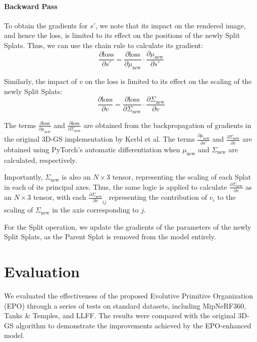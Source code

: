 \documentclass[11pt]{report}
\begin{document}
\subsubsection{Backward Pass}
To obtain the gradients for $s'$, we note that its impact on the rendered image, and hence the loss, is limited to its effect on the positions of the newly Split Splats. Thus, we can use the chain rule to calculate its gradient:
\[ \frac{\partial \text{loss}}{\partial s'} = \frac{\partial \text{loss}}{\partial \mu_{\text{new}}} \cdot \frac{\partial \mu_{\text{new}}}{\partial s'} \]

Similarly, the impact of $v$ on the loss is limited to its effect on the scaling of the newly Split Splats:
\[ \frac{\partial \text{loss}}{\partial v} = \frac{\partial \text{loss}}{\partial \Sigma_{\text{new}}} \cdot \frac{\partial \Sigma_{\text{new}}}{\partial v} \]

The terms $\frac{\partial \text{loss}}{\partial \mu_{\text{new}}}$ and $\frac{\partial \text{loss}}{\partial \Sigma_{\text{new}}}$ are obtained from the backpropagation of gradients in the original 3D-GS implementation by Kerbl et al. The terms $\frac{\partial \mu_{\text{new}}}{\partial s'}$ and $\frac{\partial \Sigma_{\text{new}}}{\partial v}$ are obtained using PyTorch's automatic differentiation when $\mu_{\text{new}}$ and $\Sigma_{\text{new}}$ are calculated, respectively.

Importantly, $\Sigma_{\text{new}}$ is also an $N \times 3$ tensor, representing the scaling of each Splat in each of its principal axes. Thus, the same logic is applied to calculate $\frac{\partial \Sigma_{\text{new}}}{\partial v}$ as an $N \times 3$ tensor, with each $\frac{\partial \Sigma_{\text{new}}}{\partial v}_{ij}$ representing the contribution of $v_i$ to the scaling of $\Sigma_{\text{new}}$ in the axis corresponding to $j$.

For the Split operation, we update the gradients of the parameters of the newly Split Splats, as the Parent Splat is removed from the model entirely.

\chapter{Evaluation}
We evaluated the effectiveness of the proposed Evolutive Primitive Organization (EPO) through a series of tests on standard datasets, including MipNeRF360, Tanks \& Temples, and LLFF. The results were compared with the original 3D-GS algorithm to demonstrate the improvements achieved by the EPO-enhanced model.
\end{document}
